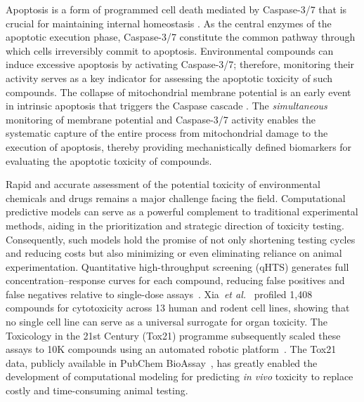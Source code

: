 \documentclass[letterpaper]{article}
\begin{document}

Apoptosis is a form of programmed cell death mediated by Caspase-3/7 that is crucial for maintaining internal homeostasis \cite{bursch2008cell}. As the central enzymes of the apoptotic execution phase, Caspase-3/7 constitute the common pathway through which cells irreversibly commit to apoptosis. Environmental compounds can induce excessive apoptosis by activating Caspase-3/7; therefore, monitoring their activity serves as a key indicator for assessing the apoptotic toxicity of such compounds. The collapse of mitochondrial membrane potential is an early event in intrinsic apoptosis that triggers the Caspase cascade \cite{gogvadze2006mitochondrial}. The \emph{simultaneous} monitoring of membrane potential and Caspase-3/7 activity enables the systematic capture of the entire process from mitochondrial damage to the execution of apoptosis, thereby providing mechanistically defined biomarkers for evaluating the apoptotic toxicity of compounds.

Rapid and accurate assessment of the potential toxicity of environmental chemicals and drugs remains a major challenge facing the field. Computational predictive models can serve as a powerful complement to traditional experimental methods, aiding in the prioritization and strategic direction of toxicity testing. Consequently, such models hold the promise of not only shortening testing cycles and reducing costs but also minimizing or even eliminating reliance on animal experimentation. 
Quantitative high-throughput screening (qHTS) generates full concentration--response curves for each compound, reducing false positives and false negatives relative to single-dose assays~\cite{inglese2006}. Xia~\textit{et al.}~\cite{xia2008} profiled 1,408 compounds for cytotoxicity across 13 human and rodent cell lines, showing that no single cell line can serve as a universal surrogate for organ toxicity. The Toxicology in the 21st Century (Tox21) programme subsequently scaled these assays to 10K compounds using an automated robotic platform~\cite{atteneramos2013}. The Tox21 data, publicly available in PubChem BioAssay~\cite{wang2014pubchem}, has greatly enabled the development of computational modeling for predicting \emph{in vivo} toxicity to replace costly and time-consuming animal testing.
\end{document}
